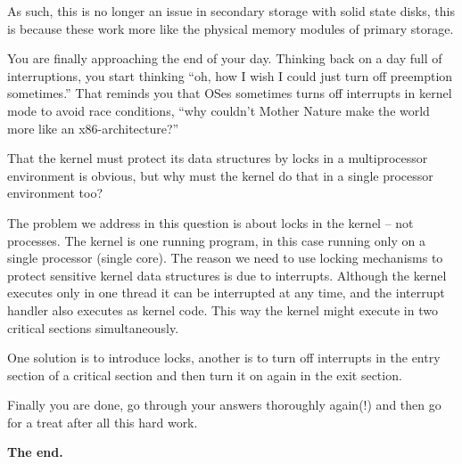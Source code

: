 \documentclass[addpoints,svv]{miunexam}
\begin{document}
\begin{questions}
\begin{parts}
\begin{solution}
      As such, this is no longer an issue in secondary storage with solid state 
      disks, this is because these work more like the physical memory modules 
      of primary storage.
    \end{solution}
  \end{parts}


  \question[3]
  You are finally approaching the end of your day.
  Thinking back on a day full of interruptions, you start thinking ``oh, how 
  I wish I could just turn off preemption sometimes.''
  That reminds you that OSes sometimes turns off interrupts in kernel mode to 
  avoid race conditions, ``why couldn't Mother Nature make the world more like 
  an x86-architecture?''

  That the kernel must protect its data structures by locks in a multiprocessor 
  environment is obvious, but why must the kernel do that in a single processor 
  environment too?
  \begin{solution}
    The problem we address in this question is about locks in the kernel -- not 
    processes.
    The kernel is one running program, in this case running only on a single 
    processor (single core).
    The reason we need to use locking mechanisms to protect sensitive kernel 
    data structures is due to interrupts.
    Although the kernel executes only in one thread it can be interrupted at 
    any time, and the interrupt handler also executes as kernel code.
    This way the kernel might execute in two critical sections simultaneously.

    One solution is to introduce locks, another is to turn off interrupts in 
    the entry section of a critical section and then turn it on again in the 
    exit section.
  \end{solution}

\end{questions}

Finally you are done, go through your answers thoroughly again(!) and then go 
for a treat after all this hard work.
\begin{center}
  \textbf{The end.}
\end{center}


\end{document}
